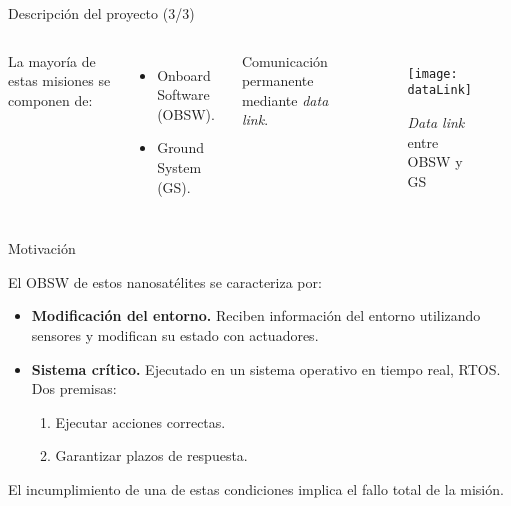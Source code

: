 \begin{frame}{Descripción del proyecto (3/3)}

\begin{columns}

\vfill
La mayoría de estas misiones se componen de:

\begin{itemize}
\item Onboard Software (OBSW).
\item Ground System (GS).
\end{itemize}

\vspace{.1in}
Comunicación permanente mediante \emph{data link}.

\vfill

\begin{figure}
\centering
\texttt{[image: dataLink]}
\caption{\emph{Data link} entre OBSW y GS}
\end{figure}

\end{columns}

\end{frame}



\begin{frame}{Motivación}

El OBSW de estos nanosatélites se caracteriza por:

\begin{itemize}
\item \textbf{Modificación del entorno.} Reciben información del entorno utilizando sensores y modifican su estado con actuadores.
\item \textbf{Sistema crítico.} Ejecutado en un sistema operativo en tiempo real, RTOS. Dos premisas:

	\begin{enumerate}
		\item Ejecutar acciones correctas.
		\item Garantizar plazos de respuesta.
	\end{enumerate}

\end{itemize}

El incumplimiento de una de estas condiciones implica el \alert{fallo total} de la misión.

\end{frame}


